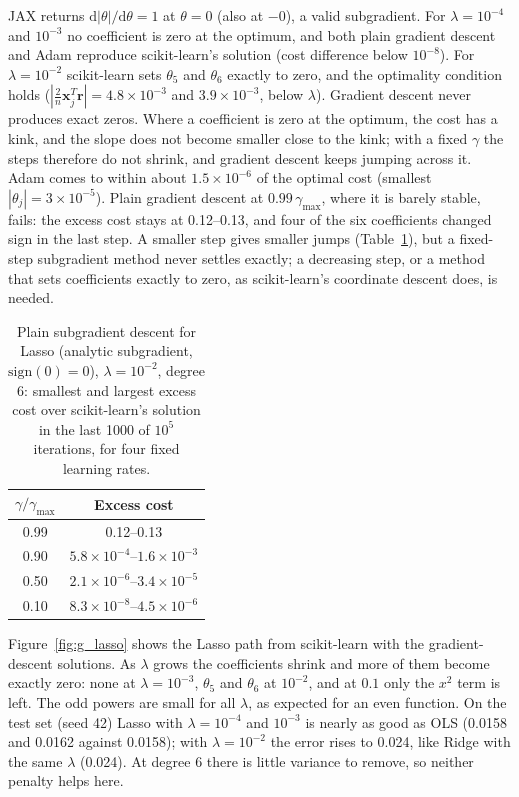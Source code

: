 JAX returns $\mathrm{d}|\theta|/\mathrm{d}\theta = 1$ at $\theta = 0$ (also at $-0$), a valid subgradient. For $\lambda = 10^{-4}$ and $10^{-3}$ no coefficient is zero at the optimum, and both plain gradient descent and Adam reproduce scikit-learn's solution (cost difference below $10^{-8}$). For $\lambda = 10^{-2}$ scikit-learn sets $\theta_5$ and $\theta_6$ exactly to zero, and the optimality condition holds ($|\frac{2}{n}\mathbf{x}_j^T\mathbf{r}| = 4.8\times10^{-3}$ and $3.9\times10^{-3}$, below $\lambda$). Gradient descent never produces exact zeros. Where a coefficient is zero at the optimum, the cost has a kink, and the slope does not become smaller close to the kink; with a fixed $\gamma$ the steps therefore do not shrink, and gradient descent keeps jumping across it. Adam comes to within about $1.5\times10^{-6}$ of the optimal cost (smallest $|\theta_j| = 3\times10^{-5}$). Plain gradient descent at $0.99\,\gamma_{\max}$, where it is barely stable, fails: the excess cost stays at 0.12--0.13, and four of the six coefficients changed sign in the last step. A smaller step gives smaller jumps (Table~\ref{tab:g_lasso}), but a fixed-step subgradient method never settles exactly; a decreasing step, or a method that sets coefficients exactly to zero, as scikit-learn's coordinate descent does, is needed.

\begin{table}
    \centering
    \caption{Plain subgradient descent for Lasso (analytic subgradient, $\mathrm{sign}(0) = 0$), $\lambda = 10^{-2}$, degree 6: smallest and largest excess cost over scikit-learn's solution in the last 1000 of $10^5$ iterations, for four fixed learning rates.}
    \label{tab:g_lasso}
    \begin{tabular}{cc}
        \toprule
        $\gamma / \gamma_{\max}$ & Excess cost \\
        \midrule
        0.99 & 0.12--0.13 \\
        0.90 & $5.8\times10^{-4}$--$1.6\times10^{-3}$ \\
        0.50 & $2.1\times10^{-6}$--$3.4\times10^{-5}$ \\
        0.10 & $8.3\times10^{-8}$--$4.5\times10^{-6}$ \\
        \bottomrule
    \end{tabular}
\end{table}

Figure~\ref{fig:g_lasso} shows the Lasso path from scikit-learn with the gradient-descent solutions. As $\lambda$ grows the coefficients shrink and more of them become exactly zero: none at $\lambda = 10^{-3}$, $\theta_5$ and $\theta_6$ at $10^{-2}$, and at $0.1$ only the $x^2$ term is left. The odd powers are small for all $\lambda$, as expected for an even function. On the test set (seed 42) Lasso with $\lambda = 10^{-4}$ and $10^{-3}$ is nearly as good as OLS (0.0158 and 0.0162 against 0.0158); with $\lambda = 10^{-2}$ the error rises to 0.024, like Ridge with the same $\lambda$ (0.024). At degree 6 there is little variance to remove, so neither penalty helps here.

